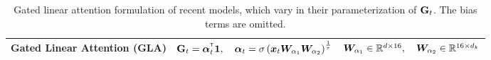 \begin{table}[t!]
{\begin{tabular}{l l l }
  Gated Linear Attention (GLA) & $\rmG_t = \balpha_t^\intercal \mathbf{1}, \quad \balpha_t = \sigma\left(\vx_t\mW_{\alpha_1}\mW_{\alpha_2}\right)^{\frac{1}{\tau}}$ & ${\bm{W}}_{\alpha_1} \in \mathbb{R}^{d\times 16}, \quad {\bm{W}}_{\alpha_2}\in \mathbb{R}^{16 \times d_k}$ \\
  \bottomrule
\end{tabular}
}
\vspace{1mm}
%
\vspace{-4mm}
\caption{Gated linear attention formulation of recent  models, which vary in their parameterization of ${\mathbf{G}}_t$. The bias terms are omitted.}
\vspace{-4mm}
\label{tab:G_param}
\end{table}